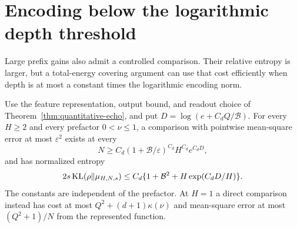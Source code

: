 \section{Encoding below the logarithmic depth threshold}
\label{sec:high-gain-encoding}
Large prefix gains also admit a controlled comparison. Their relative entropy is larger, but a total-energy covering argument can use that cost efficiently when depth is at most a constant times the logarithmic encoding norm.

\begin{theorem}
\label{thm:high-gain-echo}
Use the feature representation, output bound, and readout choice of Theorem~\ref{thm:quantitative-echo}, and put $D=\log(e+C_dQ/\mathcal B)$. For every $H\ge2$ and every prefactor $0<\nu\le1$, a comparison with pointwise mean-square error at most $\varepsilon^2$ exists at every
\[
 N\ge C_d(1+\mathcal B/\varepsilon)^{C_d}H^{C_d}e^{C_dD},
\]
and has normalized entropy
\[
 2s\operatorname{KL}(\rho\|\mu_{H,N,s})
       \le C_d\{1+\mathcal B^2+H\exp(C_dD/H)\}.
\]
The constants are independent of the prefactor. At $H=1$ a direct comparison instead has cost at most $Q^2+(d+1)\kappa(\nu)$ and mean-square error at most $(Q^2+1)/N$ from the represented function.
\end{theorem}
